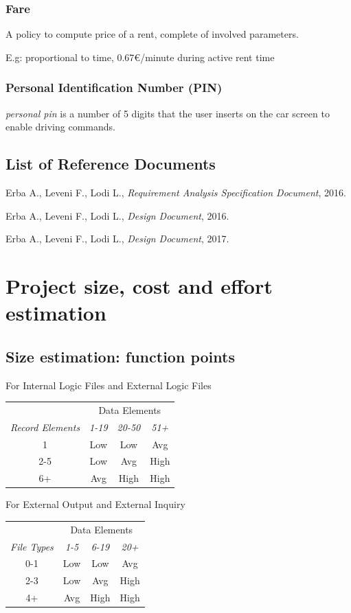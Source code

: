 \documentclass[english]{article}
\newenvironment{fptable}[2]{
	\begin{center}
	#1
	\begin{longtable}{|c|c|c|c|}
	\hline 
	&
	\multicolumn{3}{|c|}{{#2}}\\\nopagebreak\hline	
}{
	\hline\end{longtable}\end{center}
}
\newcommand{\fpvalues}[4]{%
	\textit{#1} & \textit{#2}& \textit{#3}& \textit{#4}\\\nopagebreak\hline
}
\newcommand{\personalpin}{\textit{personal pin }}
\begin{document}
	\subsubsection{Fare}
		A policy to compute price of a rent, complete of involved parameters. \par E.g: proportional to time, 0.67\euro/minute during active rent time 
	\subsubsection{Personal Identification Number (PIN)}
		 \personalpin is a number of 5 digits that the user inserts on the car screen to enable driving commands.
	
\subsection{List of Reference Documents}
	\begin{thebibliography}{9}

			Erba A., Leveni F., Lodi L.,
  			\emph{Requirement Analysis Specification Document},
 			2016.
 			
			 Erba A., Leveni F., Lodi L.,
  			\emph{Design Document},
 			2016.
 			
			 Erba A., Leveni F., Lodi L.,
  			\emph{Design Document},
 			2017.
	\end{thebibliography}	 
		 
\section{Project size, cost and effort estimation}
\subsection{Size estimation: function points}
\begin{fptable}{For Internal Logic Files and External Logic Files}{Data Elements}
\fpvalues{Record Elements}{1-19}{20-50}{51+}
1 & Low & Low & Avg\\
2-5 & Low & Avg & High\\
6+ & Avg & High & High\\
\end{fptable}

\begin{fptable}{For External Output and External Inquiry}{Data Elements}
\fpvalues{File Types}{1-5}{6-19}{20+}
0-1 & Low & Low & Avg\\
2-3 & Low & Avg & High\\
4+ & Avg & High & High\\
\end{fptable}
\end{document}
